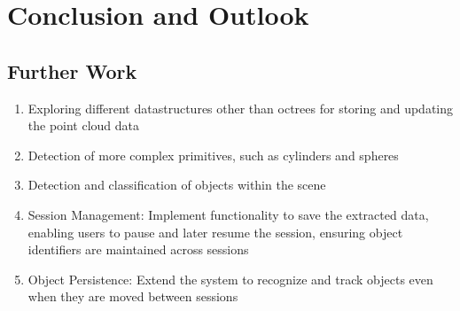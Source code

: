 \chapter{Conclusion and Outlook}

\section{Further Work}
\begin{enumerate}
    \item Exploring different datastructures other than octrees for storing and updating the point cloud data
    \item Detection of more complex primitives, such as cylinders and spheres
    \item Detection and classification of objects within the scene
    \item Session Management: Implement functionality to save the extracted data, enabling users to pause and later resume the session, ensuring object identifiers are maintained across sessions
    \item Object Persistence: Extend the system to recognize and track objects even when they are moved between sessions
\end{enumerate}


